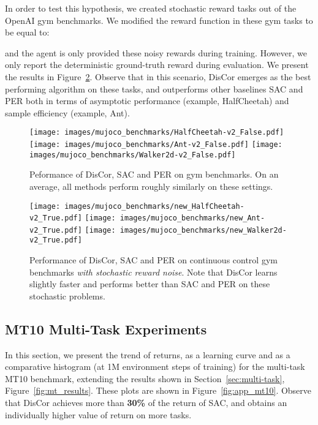 \documentclass[jmlr]{article}
\begin{document}
In order to test this hypothesis, we created stochastic reward tasks out of the OpenAI gym benchmarks. We modified the reward function  in these gym tasks to be equal to:

and the agent is only provided these noisy rewards during training. However, we only report the deterministic ground-truth reward during evaluation. 
We present the results in Figure~\ref{fig:sac_noisy_results}. Observe that in this scenario, DisCor emerges as the best performing algorithm on these tasks, and outperforms other baselines SAC and PER both in terms of asymptotic performance (example, HalfCheetah) and sample efficiency (example, Ant).

\begin{figure}[H]
    \centering
    \texttt{[image: images/mujoco\_benchmarks/HalfCheetah-v2\_False.pdf]}
    \texttt{[image: images/mujoco\_benchmarks/Ant-v2\_False.pdf]}
    \texttt{[image: images/mujoco\_benchmarks/Walker2d-v2\_False.pdf]}
    \caption{\footnotesize{Peformance of DisCor, SAC and PER on gym benchmarks. On an average, all methods perform roughly similarly on these settings.}}
    \label{fig:app_mujoco_results}
\end{figure}

\begin{figure}[H]
    \centering
        \texttt{[image: images/mujoco\_benchmarks/new\_HalfCheetah-v2\_True.pdf]}
        \texttt{[image: images/mujoco\_benchmarks/new\_Ant-v2\_True.pdf]}
        \texttt{[image: images/mujoco\_benchmarks/new\_Walker2d-v2\_True.pdf]}
    \caption{\footnotesize{Performance of DisCor, SAC and PER on continuous control gym benchmarks \textit{with stochastic reward noise}. Note that DisCor learns slightly faster and performs better than SAC and PER on these stochastic problems.}}
    \label{fig:sac_noisy_results}
\end{figure}

\subsection{MT10 Multi-Task Experiments}
\label{sec:app_multi_task}
In this section, we present the trend of returns, as a learning curve and as a comparative histogram (at 1M environment steps of training) for the multi-task MT10 benchmark, extending the results shown in Section~\ref{sec:multi-task}, Figure~\ref{fig:mt_results}. These plots are shown in Figure~\ref{fig:app_mt10}. Observe that DisCor achieves more than \textbf{30\%} of the return of SAC, and obtains an individually higher value of return on more tasks. 
\end{document}
